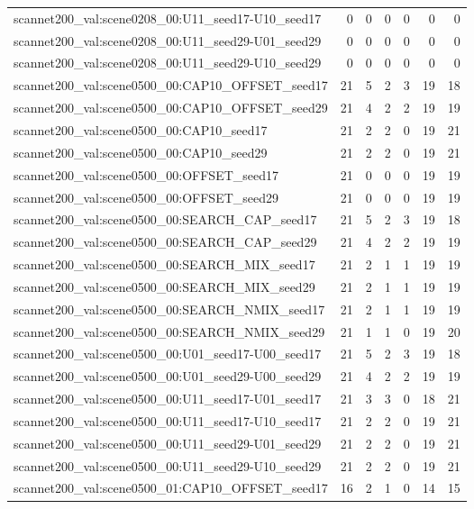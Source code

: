 \begin{table}[t]
\begin{tabular}{lrrrrrr}
scannet200\_val:scene0208\_00:U11\_seed17-U10\_seed17 & 0 & 0 & 0 & 0 & 0 & 0 \\
scannet200\_val:scene0208\_00:U11\_seed29-U01\_seed29 & 0 & 0 & 0 & 0 & 0 & 0 \\
scannet200\_val:scene0208\_00:U11\_seed29-U10\_seed29 & 0 & 0 & 0 & 0 & 0 & 0 \\
scannet200\_val:scene0500\_00:CAP10\_OFFSET\_seed17 & 21 & 5 & 2 & 3 & 19 & 18 \\
scannet200\_val:scene0500\_00:CAP10\_OFFSET\_seed29 & 21 & 4 & 2 & 2 & 19 & 19 \\
scannet200\_val:scene0500\_00:CAP10\_seed17 & 21 & 2 & 2 & 0 & 19 & 21 \\
scannet200\_val:scene0500\_00:CAP10\_seed29 & 21 & 2 & 2 & 0 & 19 & 21 \\
scannet200\_val:scene0500\_00:OFFSET\_seed17 & 21 & 0 & 0 & 0 & 19 & 19 \\
scannet200\_val:scene0500\_00:OFFSET\_seed29 & 21 & 0 & 0 & 0 & 19 & 19 \\
scannet200\_val:scene0500\_00:SEARCH\_CAP\_seed17 & 21 & 5 & 2 & 3 & 19 & 18 \\
scannet200\_val:scene0500\_00:SEARCH\_CAP\_seed29 & 21 & 4 & 2 & 2 & 19 & 19 \\
scannet200\_val:scene0500\_00:SEARCH\_MIX\_seed17 & 21 & 2 & 1 & 1 & 19 & 19 \\
scannet200\_val:scene0500\_00:SEARCH\_MIX\_seed29 & 21 & 2 & 1 & 1 & 19 & 19 \\
scannet200\_val:scene0500\_00:SEARCH\_NMIX\_seed17 & 21 & 2 & 1 & 1 & 19 & 19 \\
scannet200\_val:scene0500\_00:SEARCH\_NMIX\_seed29 & 21 & 1 & 1 & 0 & 19 & 20 \\
scannet200\_val:scene0500\_00:U01\_seed17-U00\_seed17 & 21 & 5 & 2 & 3 & 19 & 18 \\
scannet200\_val:scene0500\_00:U01\_seed29-U00\_seed29 & 21 & 4 & 2 & 2 & 19 & 19 \\
scannet200\_val:scene0500\_00:U11\_seed17-U01\_seed17 & 21 & 3 & 3 & 0 & 18 & 21 \\
scannet200\_val:scene0500\_00:U11\_seed17-U10\_seed17 & 21 & 2 & 2 & 0 & 19 & 21 \\
scannet200\_val:scene0500\_00:U11\_seed29-U01\_seed29 & 21 & 2 & 2 & 0 & 19 & 21 \\
scannet200\_val:scene0500\_00:U11\_seed29-U10\_seed29 & 21 & 2 & 2 & 0 & 19 & 21 \\
scannet200\_val:scene0500\_01:CAP10\_OFFSET\_seed17 & 16 & 2 & 1 & 0 & 14 & 15 \\

\end{tabular}
\end{table}
